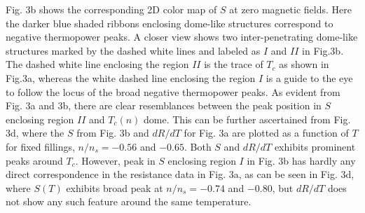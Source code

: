 \documentclass{nature}
\begin{document}
Fig. 3b shows the corresponding 2D color map of $S$ at zero magnetic fields. Here the darker blue shaded ribbons enclosing dome-like structures correspond to negative thermopower peaks. A closer view shows two inter-penetrating dome-like structures marked by the dashed white lines and labeled as $I$ and $II$ in Fig.3b. The dashed white line enclosing the region $II$ is the trace of $T_{c}$ as shown in Fig.3a, whereas the white dashed line enclosing the region $I$ is a guide to the eye to follow the locus of the broad negative thermopower peaks. As evident from Fig. 3a and 3b, there are clear resemblances between the peak position in $S$ enclosing region $II$ and $T_{c}(n)$ dome. This can be further ascertained from Fig. 3d, where the $S$ from Fig. 3b and $dR/dT$ for Fig. 3a are plotted as a function of $T$ for fixed fillings, $n/n_{s} = -0.56$ and $-0.65$. Both $S$ and $dR/dT$ exhibits prominent peaks around $T_c$. However, peak in $S$ enclosing region $I$ in Fig. 3b has hardly any direct correspondence in the resistance data in Fig. 3a, as can be seen in Fig. 3d, where $S(T)$ exhibits broad peak at $n/n_{s} = -0.74$ and $-0.80$, but $dR/dT$ does not show any such feature around the same temperature. %
\end{document}
